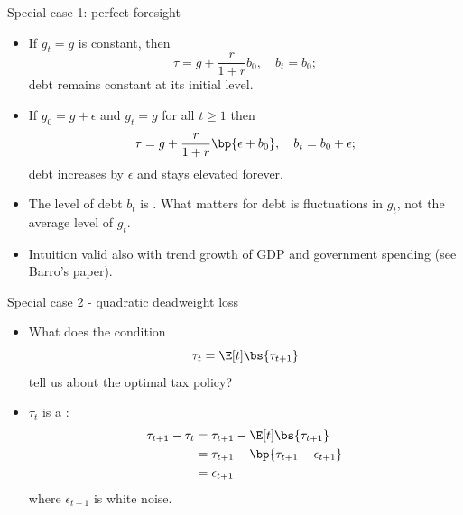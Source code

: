 \documentclass[11pt,xcolor={dvipsnames},hyperref={pdftex,pdfpagemode=UseNone,hidelinks,pdfdisplaydoctitle=true},usepdftitle=false]{beamer}
\begin{document}
    \begin{frame}{Special case 1: perfect foresight}
        \begin{itemize} 
            \item If $g_t=g$ is constant, then \vspace{-2pt}
            \[ \tau = g + \frac{r}{1+r}b_0, \quad b_t = b_0; \] debt remains constant at its initial level. 
            \item If $g_0 = g + \epsilon$ and $g_t = g$ for all $t\geq1$ then  \vspace{-2pt}\[\tau=g+\frac{r}{1+r}\bp{\epsilon+b_0}, \quad b_t = b_0 + \epsilon;\] debt increases by $\epsilon$ and stays elevated forever.
        \item The level of debt $b_t$ is . What matters for debt is  fluctuations in $g_t$, not the average level of $g_t$.
        \item Intuition valid also with trend growth of GDP and government spending (see Barro's paper). 
            \end{itemize}
            
    
    \end{frame}


    \begin{frame}{Special case 2 - quadratic deadweight loss}
    
    \begin{itemize}
    \item What does the condition \[\tau_{t}=\E[t]\bs{\tau_{t+1}}\] tell
    us about the optimal tax policy? 
    \item $\tau_{t}$ is a : 
     \begin{align*}
    \tau_{t+1}-\tau_{t} & =\tau_{t+1}-\E[t]\bs{\tau_{t+1}}\\
     & =\tau_{t+1}-\bp{\tau_{t+1}-\epsilon_{t+1}}\\
     & =\epsilon_{t+1}
    \end{align*}
    where $\epsilon_{t+1}$ is white noise.
    \end{itemize}
    \end{frame}
\end{document}
